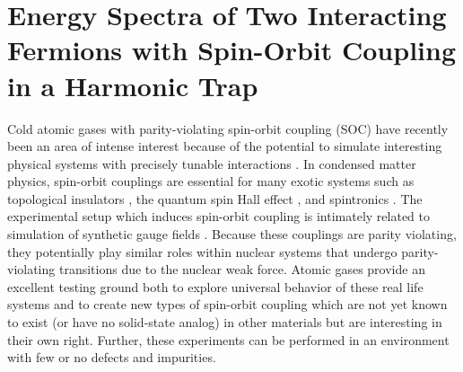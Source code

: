 \chapter{\label{chap:SOC}Energy Spectra of Two Interacting Fermions with Spin-Orbit Coupling in a Harmonic Trap}


Cold atomic gases with parity-violating spin-orbit coupling (SOC) have recently been an area of intense interest because of the potential to simulate interesting physical systems with precisely tunable interactions \cite{nature11841}. In condensed matter physics, spin-orbit couplings are essential for many exotic systems such as topological insulators \cite{das2013engineering,PhysRevLett.105.255302}, the quantum spin Hall effect \cite{nature12185}, and spintronics \cite{RevModPhys.76.323}. The experimental setup which induces spin-orbit coupling is intimately related to simulation of synthetic gauge fields \cite{RevModPhys.83.1523,hamner2014dicke,Lin:2009zzb,Bermudez:2011db}. Because these couplings are parity violating, they potentially play similar roles within nuclear systems that undergo parity-violating transitions due to the nuclear weak force.  Atomic gases provide an excellent testing ground both to explore universal behavior of these real life systems and to create new types of spin-orbit coupling which are not yet known to exist (or have no solid-state analog) in other materials but are interesting in their own right. Further, these experiments can be performed in an environment with few or no defects and impurities.

